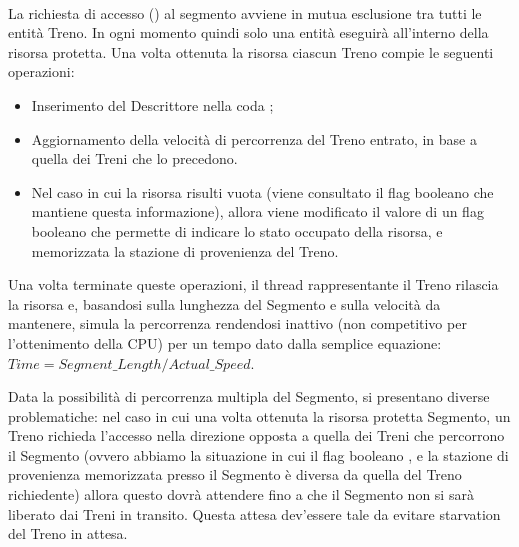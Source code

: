 		\begin{description}
			
			\item {} \\
			
			La richiesta di accesso () al segmento avviene in mutua esclusione tra tutti le entità Treno. In ogni momento quindi solo una entità eseguirà all'interno della risorsa protetta. Una volta ottenuta la risorsa ciascun Treno compie le seguenti operazioni:
			 \begin{itemize}
			 	\item Inserimento del Descrittore nella coda ;
			 	\item Aggiornamento della velocità di percorrenza del Treno entrato, in base a quella dei Treni che lo precedono.
			 	\item Nel caso in cui la risorsa risulti vuota (viene consultato il flag booleano che mantiene questa informazione), allora viene modificato il valore di un flag booleano  che permette di indicare lo stato occupato della risorsa, e memorizzata la stazione di provenienza del Treno.
			\end{itemize}
			Una volta terminate queste operazioni, il thread rappresentante il Treno rilascia la risorsa e, basandosi sulla lunghezza del Segmento e sulla velocità da mantenere, simula la percorrenza rendendosi inattivo (non competitivo per l'ottenimento della CPU) per un tempo dato dalla semplice equazione: $ Time = Segment\_Length / Actual\_Speed $.
			
			Data la possibilità di percorrenza multipla del Segmento, si presentano diverse problematiche: nel caso in cui una volta ottenuta la risorsa protetta Segmento, un Treno richieda l'accesso nella direzione opposta a quella dei Treni che percorrono il Segmento (ovvero abbiamo la situazione in cui il flag booleano , e la stazione di provenienza memorizzata presso il Segmento è diversa da quella del Treno richiedente) allora questo dovrà attendere fino a che il Segmento non si sarà liberato dai Treni in transito. Questa attesa dev'essere tale da evitare starvation del Treno in attesa.
			

\end{description}
